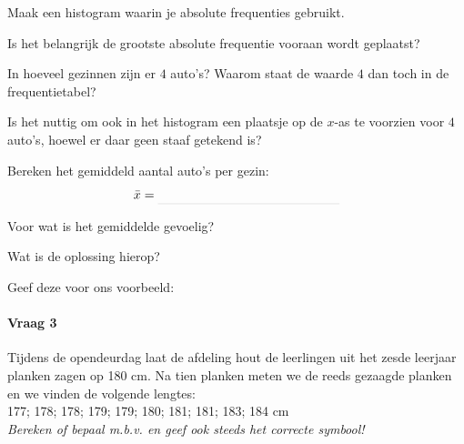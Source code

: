 \documentclass[12pt,twoside]{article}
\begin{document}
Maak een histogram waarin je absolute frequenties gebruikt.

\begin{center}
\end{center}

Is het belangrijk de grootste absolute frequentie vooraan wordt geplaatst?

In hoeveel gezinnen zijn er $4$ auto's? \arulefill
Waarom staat de waarde $4$ dan toch in de frequentietabel?

Is het nuttig om ook in het histogram een plaatsje op de $x$-as te voorzien voor $4$ auto's, hoewel er daar geen staaf getekend is?

Bereken het gemiddeld aantal auto's per gezin:
$$\bar{x}=\arule{5cm}$$

Voor wat is het gemiddelde gevoelig?

Wat is de oplossing hierop?

Geef deze voor ons voorbeeld:

\newpage
\paragraph{Vraag 3}
Tijdens de opendeurdag laat de afdeling hout de leerlingen uit het zesde leerjaar planken zagen op 180 cm. Na tien planken meten we de reeds gezaagde planken en we vinden de volgende lengtes:\\
177; 178; 178; 179; 179; 180; 181; 181; 183; 184 cm\\

{\em Bereken of bepaal m.b.v.  en geef ook steeds het correcte symbool!}
\end{document}
